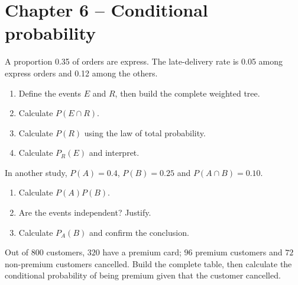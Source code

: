 \section*{Chapter 6 -- Conditional probability}
\begin{exercice}
A proportion 0.35 of orders are express. The late-delivery rate is 0.05 among express orders and 0.12 among the others.
\begin{enumerate}
\item Define the events $E$ and $R$, then build the complete weighted tree.
\item Calculate $P(E\cap R)$.
\item Calculate $P(R)$ using the law of total probability.
\item Calculate $P_R(E)$ and interpret.
\end{enumerate}
\end{exercice}
\begin{exercice}[2 -- Independence]
In another study, $P(A)=0.4$, $P(B)=0.25$ and $P(A\cap B)=0.10$.
\begin{enumerate}
\item Calculate $P(A)P(B)$.
\item Are the events independent? Justify.
\item Calculate $P_A(B)$ and confirm the conclusion.
\end{enumerate}
\end{exercice}
\begin{exercice}
Out of $800$ customers, $320$ have a premium card; $96$ premium customers and $72$ non-premium customers cancelled. Build the complete table, then calculate the conditional probability of being premium given that the customer cancelled.
\end{exercice}

